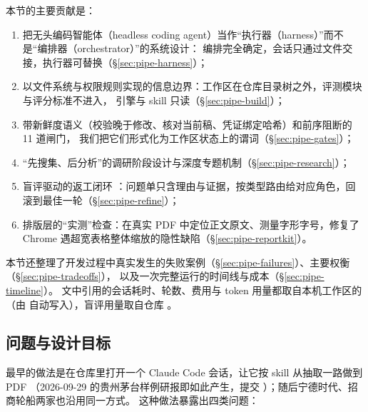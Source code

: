 本节的主要贡献是：
\begin{enumerate}
  \item 把无头编码智能体（headless coding agent）当作“执行器（harness）”而不是“编排器（orchestrator）”的系统设计：
        编排完全确定，会话只通过文件交接，执行器可替换（\S\ref{sec:pipe-harness}）；
  \item 以文件系统与权限规则实现的信息边界：工作区在仓库目录树之外，评测模块与评分标准不进入，
        引擎与 skill 只读（\S\ref{sec:pipe-build}）；
  \item 带新鲜度语义（校验晚于修改、核对当前稿、凭证绑定哈希）和前序阻断的 11 道闸门，
        我们把它们形式化为工作区状态上的谓词（\S\ref{sec:pipe-gates}）；
  \item “先搜集、后分析”的调研阶段设计与深度专题机制（\S\ref{sec:pipe-research}）；
  \item 盲评驱动的返工闭环 ：问题单只含理由与证据，按类型路由给对应角色，回滚到最佳一轮（\S\ref{sec:pipe-refine}）；
  \item 排版层的“实测”检查：在真实 PDF 中定位正文原文、测量字形字号，修复了 Chrome 遇超宽表格整体缩放的隐性缺陷（\S\ref{sec:pipe-reportkit}）。
\end{enumerate}
本节还整理了开发过程中真实发生的失败案例（\S\ref{sec:pipe-failures}）、主要权衡（\S\ref{sec:pipe-tradeoffs}），
以及一次完整运行的时间线与成本（\S\ref{sec:pipe-timeline}）。
文中引用的会话耗时、轮数、费用与 token 用量都取自本机工作区的 
（由  自动写入），盲评用量取自仓库 。

\subsection{问题与设计目标}
\label{sec:pipe-goals}

最早的做法是在仓库里打开一个 Claude Code 会话，让它按 skill 从抽取一路做到 PDF
（2026-09-29 的贵州茅台样例研报即如此产生，提交 ）；随后宁德时代、招商轮船两家也沿用同一方式。
这种做法暴露出四类问题：

